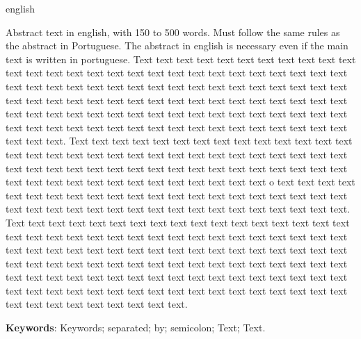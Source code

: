 \begin{resumo}[Abstract]
\begin{otherlanguage*}{english}

Abstract text in english, with 150 to 500 words. Must follow the same rules as the abstract in Portuguese. The abstract in english is necessary even if the main text is written in portuguese. Text text text text text text text text text text text text text text text text text text text text text text text text text text text text text text text text text text text text text text text text text text text text text text text text text text text text text text text text text text text text text text text text text text text text text text text text text text text text text text text text text text text text text text text text text text text text text text text text text text text. Text text text text text text text text text text text text text text text text text text text text text text text text text text text text text text text text text text text text text text text text text text text text text text text text text text text text text text text text text text text text text o text text text text text text text text text text text text text text text text text text text text text text text text text text text text text text text text text text text text text text. Text text text text text text text text text text text text text text text text text text text text text text text text text text text text text text text text text text text text text text text text text text text text text text text text text text text text text text text text text text text text text text text text text text text text text text text text text text text text text text text text text text text text text text text text text text text text text text text text text text text text text text text text text text text text text text text.



   \vspace{\onelineskip} 
 
   \noindent 
   \textbf{Keywords}: Keywords; separated; by; semicolon; Text; Text.
  \end{otherlanguage*}
 \end{resumo}
